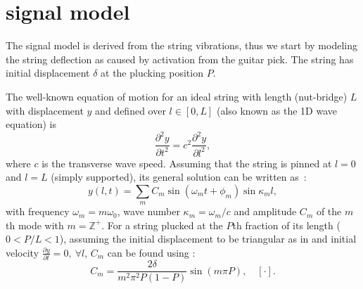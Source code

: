 
\section{signal model}
The signal model is derived from the string vibrations, thus we start by modeling the string 
deflection as caused by activation from the guitar pick. The string has initial displacement $\delta$ at the plucking position $P$. %

The well-known equation of motion for an ideal string with length (nut-bridge) $L$ with displacement $y$ and defined over $l \in [0, L]$ (also known as the 1D wave equation) is
\begin{equation}
\frac{\partial^2y}{\partial t^2} = c^2\frac{\partial^2y}{\partial l^2},
\end{equation}
where $c$ is the transverse wave speed. Assuming that the string is pinned at $l=0$ and $l=L$ (simply supported), its general solution can be written as~\cite{fletcher:physics_of_musical_instruments}:
%
\begin{equation}\label{eq:modalSum}
    y(l,t) = \sum_m C_m\sin(\omega_mt+\phi_m)\sin\kappa_ml,
\end{equation}
%
with frequency $\omega_m = m\omega_0$, wave number $\kappa_m = \omega_m / c$ and amplitude $C_m$ of the $m$th mode with $m = \mathbb{Z}^+$. For a string plucked at the $P$th fraction of its length ($0<P/L<1$), assuming the initial displacement to be triangular as in \cite{fletcher:physics_of_musical_instruments} and initial velocity $\frac{\partial y}{\partial t} = 0, \ \forall l$, $C_m$ can be found using \cite{donkin:acoustics}:
\begin{equation}
    C_m = \frac{2\delta}{m^2\pi^2P(1-P)}\sin(m\pi P), \quad [\cdot].
\end{equation}